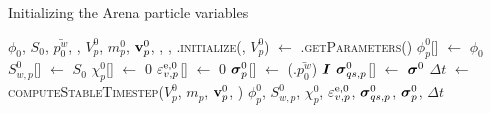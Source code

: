\begin{breakablealgorithm}
  \caption{Initializing the Arena particle variables}
  \begin{algorithmic}[1]
    \Require $\phi_0$, $S_0$, $\bar{p^w_0}$, , $V_p^0$, $m_p^0$, $\mathbf{v}_p^0$,
             , 
             , 
      \State {}.\textsc{initialize}(, $V_p^0$)
      \State {} $\leftarrow$ .\textsc{getParameters}()
        \State $\phi_p^0$[\TTpart] $\leftarrow$ $\phi_0$
        \State $S_{w,p}^0$[\TTpart] $\leftarrow$ $S_0$
        \State $\chi_p^0$[\TTpart] $\leftarrow$ $0$
        \State $\varepsilon_{v,p}^{\text{e},0}$[\TTpart] $\leftarrow$ $0$
        \State $\boldsymbol{\sigma}_p^0$[\TTpart] $\leftarrow$ (.$\bar{p^w_0}$) $\boldsymbol{I}$
        \State $\boldsymbol{\sigma}_{qs,p}^0$[\TTpart] $\leftarrow$ $\boldsymbol{\sigma}^0$
      \EndFor
      \State $\Delta t$ $\leftarrow$ \textsc{computeStableTimestep}($V_p^0$, $m_p$, $\mathbf{v}_p^0$,
                                                                    )
      \State \Return $\phi_p^0$, $S_{w,p}^0$, $\chi_p^0$, $\varepsilon_{v,p}^{\text{e},0}$, $\boldsymbol{\sigma}_{qs,p}^0$, $\boldsymbol{\sigma}_p^0$, $\Delta t$
    \EndProcedure
  \end{algorithmic}
\end{breakablealgorithm}

